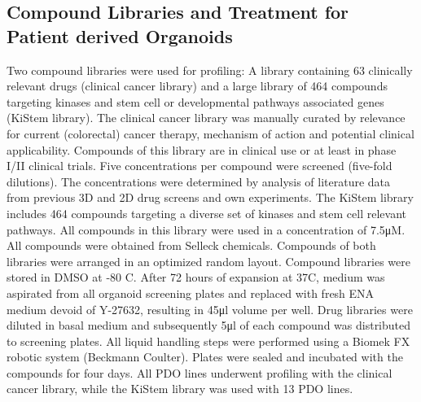 \begin{flushleft}
\subsection{Compound Libraries and Treatment for Patient derived Organoids}
Two compound libraries were used for profiling: A library containing 63 clinically relevant drugs (clinical cancer library) and a large library of 464 compounds targeting kinases and stem cell or developmental pathways associated genes (KiStem library). The clinical cancer library was manually curated by relevance for current (colorectal) cancer therapy, mechanism of action and potential clinical applicability. Compounds of this library are in clinical use or at least in phase I/II clinical trials. Five concentrations per compound were screened (five-fold dilutions). The concentrations were determined by analysis of literature data from previous 3D and 2D drug screens and own experiments. The KiStem library includes 464 compounds targeting a diverse set of kinases and stem cell relevant pathways. All compounds in this library were used in a concentration of 7.5μM. All compounds were obtained from Selleck chemicals. Compounds of both libraries were arranged in an optimized random layout. Compound libraries were stored in DMSO at -80 C.
\bigbreak
After 72 hours of expansion at 37C, medium was aspirated from all organoid screening plates and replaced with fresh ENA medium devoid of Y-27632, resulting in 45μl volume per well. Drug libraries were diluted in basal medium and subsequently 5μl of each compound was distributed to screening plates. 
All liquid handling steps were performed using a Biomek FX robotic system (Beckmann Coulter). Plates were sealed and incubated with the compounds for four days. All PDO lines underwent profiling with the clinical cancer library, while the KiStem library was used with 13 PDO lines.


\end{flushleft}
